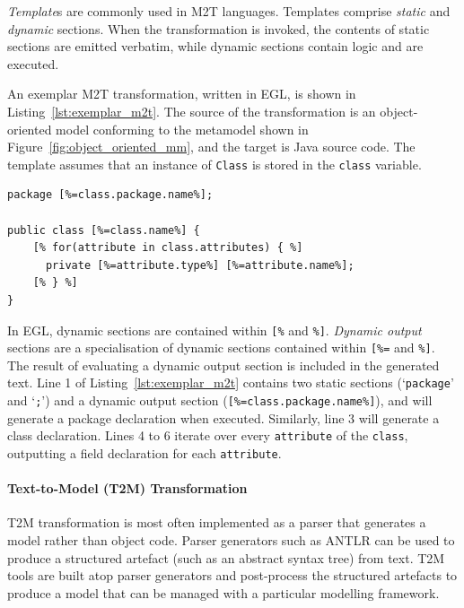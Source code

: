 \emph{Template}s are commonly used in M2T languages. Templates comprise \emph{static} and \emph{dynamic} sections. When the transformation is invoked, the contents of static sections are emitted verbatim, while dynamic sections contain logic and are executed.

An exemplar M2T transformation, written in EGL, is shown in Listing~\ref{lst:exemplar_m2t}. The source of the transformation is an object-oriented model conforming to the metamodel shown in Figure~\ref{fig:object_oriented_mm}, and the target is Java source code. The template assumes that an instance of \texttt{Class} is stored in the \texttt{class} variable.

\begin{lstlisting}[caption={[M2T transformation in EGL]M2T transformation in the Epsilon Generation Language \cite{rose08egl}}, label=lst:exemplar_m2t, language=EGL]
package [%=class.package.name%];

public class [%=class.name%] {
	[% for(attribute in class.attributes) { %]
	  private [%=attribute.type%] [%=attribute.name%];
	[% } %]
}
\end{lstlisting}

In EGL, dynamic sections are contained within \texttt{[\%} and \texttt{\%]}. \emph{Dynamic output} sections are a specialisation of dynamic sections contained within \texttt{[\%=} and \texttt{\%]}. The result of evaluating a dynamic output section is included in the generated text. Line 1 of Listing~\ref{lst:exemplar_m2t} contains two static sections (`\texttt{package}' and `\texttt{;}') and a dynamic output section (\texttt{[\%=class.package.name\%]}), and will generate a package declaration when executed.  Similarly, line 3 will generate a class declaration. Lines 4 to 6 iterate over every \texttt{attribute} of the \texttt{class}, outputting a field declaration for each \texttt{attribute}.


\paragraph{Text-to-Model (T2M) Transformation} T2M transformation is most often implemented as a parser that generates a model rather than object code. Parser generators such as ANTLR \cite{parr07antlr} can be used to produce a structured artefact (such as an abstract syntax tree) from text. T2M tools are built atop parser generators and post-process the structured artefacts to produce a model that can be managed with a particular modelling framework.

